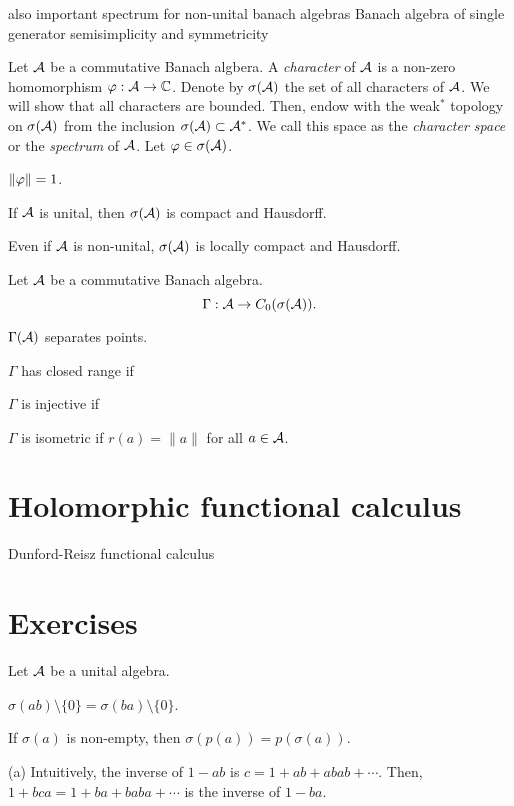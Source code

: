 \documentclass{../note}
\begin{document}
also important spectrum for non-unital banach algebras
Banach algebra of single generator
semisimplicity and symmetricity

\begin{prb}
Let $\mathcal{A}$ be a commutative Banach algbera.
A \emph{character} of $\mathcal{A}$ is a non-zero homomorphism $\varphi:\mathcal{A}\to\mathbb{C}$.
Denote by $\sigma(\mathcal{A})$ the set of all characters of $\mathcal{A}$.
We will show that all characters are bounded.
Then, endow with the weak$^*$ topology on $\sigma(\mathcal{A})$ from the inclusion $\sigma(\mathcal{A})\subset\mathcal{A}^*$.
We call this space as the \emph{character space} or the \emph{spectrum} of $\mathcal{A}$.
Let $\varphi\in\sigma(\mathcal{A})$.
\begin{parts}
\item $\|\varphi\|=1$.
\item If $\mathcal{A}$ is unital, then $\sigma(\mathcal{A})$ is compact and Hausdorff.
\item Even if $\mathcal{A}$ is non-unital, $\sigma(\mathcal{A})$ is locally compact and Hausdorff.
\end{parts}
\end{prb}


\begin{prb}
Let $\mathcal{A}$ be a commutative Banach algebra.
\[\Gamma:\mathcal{A}\to C_0(\sigma(\mathcal{A})).\]
\begin{parts}
\item $\Gamma(\mathcal{A})$ separates points.
\item $\Gamma$ has closed range if
\item $\Gamma$ is injective if
\item $\Gamma$ is isometric if $r(a)=\|a\|$ for all $a\in\mathcal{A}$.
\end{parts}
\end{prb}

\section{Holomorphic functional calculus}

Dunford-Reisz functional calculus



\section*{Exercises}
\begin{prb}
Let $\mathcal{A}$ be a unital algebra.
\begin{parts}
\item $\sigma(ab)\setminus\{0\}=\sigma(ba)\setminus\{0\}$.
\item If $\sigma(a)$ is non-empty, then $\sigma(p(a))=p(\sigma(a))$.
\end{parts}
\end{prb}
\begin{pf}
(a)
Intuitively, the inverse of $1-ab$ is $c=1+ab+abab+\cdots$.
Then, $1+bca=1+ba+baba+\cdots$ is the inverse of $1-ba$.
\end{pf}
\end{document}
